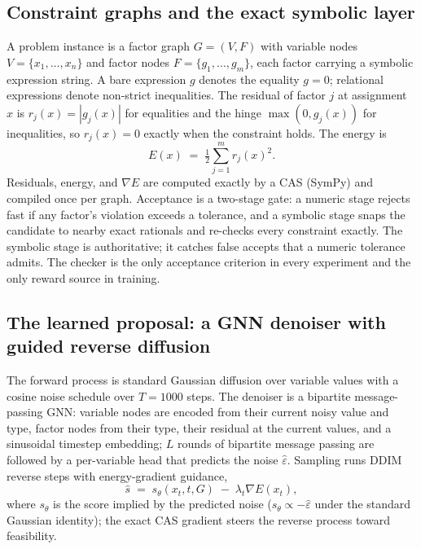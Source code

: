 \documentclass[11pt]{article}
\begin{document}
\subsection{Constraint graphs and the exact symbolic layer}

A problem instance is a factor graph $G = (V, F)$ with variable nodes $V = \{x_1, \dots,
x_n\}$ and factor nodes $F = \{g_1, \dots, g_m\}$, each factor carrying a symbolic expression
string. A bare expression $g$ denotes the equality $g = 0$; relational expressions denote
non-strict inequalities. The residual of factor $j$ at assignment $x$ is $r_j(x) = |g_j(x)|$
for equalities and the hinge $\max(0, g_j(x))$ for inequalities, so $r_j(x) = 0$ exactly when
the constraint holds. The energy is
\begin{equation}
E(x) \;=\; \tfrac{1}{2} \sum_{j=1}^{m} r_j(x)^2 .
\end{equation}
Residuals, energy, and $\nabla E$ are computed exactly by a CAS (SymPy) and compiled once per
graph. Acceptance is a two-stage gate: a numeric stage rejects fast if any factor's violation
exceeds a tolerance, and a symbolic stage snaps the candidate to nearby exact rationals and
re-checks every constraint exactly. The symbolic stage is authoritative; it catches
false accepts that a numeric tolerance admits. The checker is the only acceptance criterion in
every experiment and the only reward source in training.

\subsection{The learned proposal: a GNN denoiser with guided reverse diffusion}

The forward process is standard Gaussian diffusion over variable values with a cosine noise
schedule over $T = 1000$ steps. The denoiser is a bipartite message-passing GNN: variable
nodes are encoded from their current noisy value and type, factor nodes from their type, their
residual at the current values, and a sinusoidal timestep embedding; $L$ rounds of bipartite
message passing are followed by a per-variable head that predicts the noise
$\hat{\varepsilon}$. Sampling runs DDIM reverse steps with energy-gradient guidance,
\begin{equation}
\hat{s} \;=\; s_\theta(x_t, t, G) \;-\; \lambda_t \nabla E(x_t),
\end{equation}
where $s_\theta$ is the score implied by the predicted noise ($s_\theta \propto
-\hat{\varepsilon}$ under the standard Gaussian identity); the exact CAS gradient steers the
reverse process toward feasibility.
\end{document}
